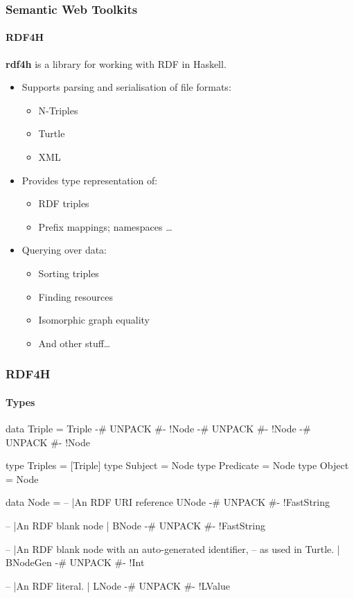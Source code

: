 \documentclass{beamer}
\begin{document}
\begin{frame}
\frametitle{Semantic Web Toolkits}
\framesubtitle{RDF4H}

\textbf{rdf4h} is a library for working with RDF in Haskell.

\begin{itemize}
\item Supports parsing and serialisation of file formats:

\begin{itemize}
\item N-Triples
\item Turtle
\item XML
\end{itemize}

\item Provides type representation of:

\begin{itemize}
\item RDF triples
\item Prefix mappings; namespaces \ldots
\end{itemize}

\item Querying over data:

\begin{itemize}
\item Sorting triples
\item Finding resources
\item Isomorphic graph equality
\item And other stuff\ldots

\end{itemize}

\end{itemize}

\end{frame}


\begin{frame}[fragile]
\frametitle{RDF4H}
\framesubtitle{Types}

\begin{haskellcode}
data Triple =
      Triple {-# UNPACK #-} !Node {-# UNPACK #-} !Node {-# UNPACK #-} !Node

type Triples = [Triple]
type Subject = Node
type Predicate = Node
type Object = Node

data Node =
  -- |An RDF URI reference
  UNode {-# UNPACK #-} !FastString

  -- |An RDF blank node
  | BNode {-# UNPACK #-} !FastString

  -- |An RDF blank node with an auto-generated identifier,
  --  as used in Turtle.
  | BNodeGen  {-# UNPACK #-} !Int

  -- |An RDF literal.
  | LNode {-# UNPACK #-} !LValue
\end{haskellcode}

\end{frame}
\end{document}

